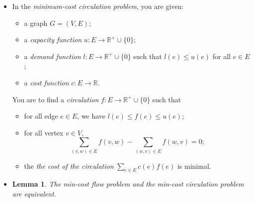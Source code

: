 \documentclass[10pt]{article}
\newtheorem{lemma}{Lemma}[section]
\begin{document}
\begin{itemize}
\begin{itemize}
          \item The {\bf disjoint path} problem asks to connect $s$ and $t$
            with $k$ disjoint paths using the smallest number of edges
            possible. This can be casted as a min-cost flow problem
            where (1) all the edges have capacity 1 and cost 1, and 
            (2) $b(s) = k$ and $b(t) = -k.$
        \end{itemize}
      
      \item In the \emph{minimum-cost circulation problem}, you are given:
        \begin{itemize}
          \item a graph $G = (V,E);$
          \item a \emph{capacity function} $u: E \rightarrow \mathbb{R}^{+} \cup \{ 0 \}$;
          \item a \emph{demand function} $l: E \rightarrow \mathbb{R}^{+} \cup \{ 0 \}$ such that $l(e) \leq u(e)$ for all $e \in E$;
          \item a \emph{cost function} $c: E \rightarrow \mathbb{R}$.
        \end{itemize}
        You are to find a \emph{circulation} $f: E \rightarrow \mathbb{R}^+ \cup \{ 0 \}$ such that
        \begin{itemize}
          \item for all edge $e \in E$, we have $l(e) \leq f(e) \leq u(e)$;
          \item for all vertex $v \in V$, $$\sum_{(v,w) \in E} f(v,w) - \sum_{(w,v) \in E} f(w,v) = 0;$$
          \item the \emph{the cost of the circulation} $\sum_{e \in E} c(e)f(e)$ is minimal.
        \end{itemize}
        
      \item
        \begin{lemma}
          The min-cost flow problem and the min-cost circulation problem are equivalent.
        \end{lemma}
        

\end{itemize}
\end{document}
